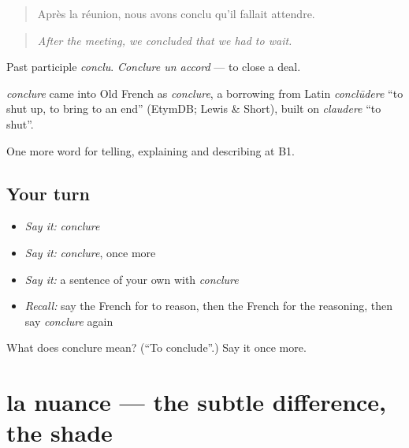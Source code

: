 \begin{quote}
Après la réunion, nous avons conclu qu'il fallait attendre.
\end{quote}

\begin{quote}
\emph{After the meeting, we concluded that we had to wait.}
\end{quote}

Past participle \emph{conclu}. \emph{Conclure un accord} — to close a deal.

\begin{cousinweb}
\emph{conclure} came into Old French as \emph{conclure}, a borrowing from Latin \emph{conclūdere} \textquotedblleft{}to shut up, to bring to an end\textquotedblright{} (EtymDB; Lewis \& Short), built on \emph{claudere} \textquotedblleft{}to shut\textquotedblright{}.
\end{cousinweb}

\begin{grammarlens}[title={What you've built}]
One more word for telling, explaining and describing at B1.
\end{grammarlens}

\subsection*{Your turn}
\begin{itemize}
\raggedright
  \item \emph{Say it:} \emph{conclure}
  \item \emph{Say it:} \emph{conclure}, once more
  \item \emph{Say it:} a sentence of your own with \emph{conclure}
  \item \emph{Recall:} say the French for to reason, then the French for the reasoning, then say \emph{conclure} again
\end{itemize}

\begin{tcolorbox}[breakable,colback=teal!4,colframe=teal!35!black,title={Before you move on}]
What does conclure mean? (\textquotedblleft{}To conclude\textquotedblright{}.) Say it once more.
\end{tcolorbox}
\section[la nuance]{la nuance — the subtle difference, the shade}

\label{lesson:FR-C344-nuance}




